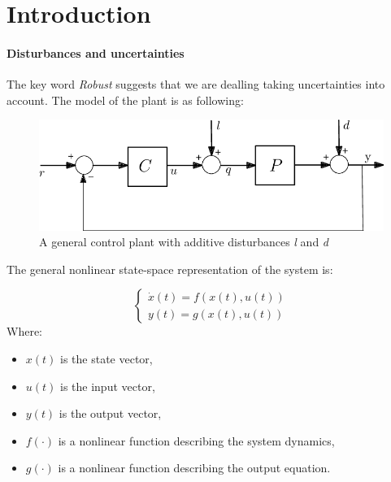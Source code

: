 
\chapter{Introduction}    %
\subsubsection{Disturbances and uncertainties}

    The key word \textit{Robust} suggests that we are dealling taking uncertainties into account. The model of the plant is as following:

\begin{figure}[htbp]
    \centering
    \includegraphics[width=\textwidth]{images/1.png} %
    \caption{A general control plant with additive disturbances \textit{l} and \textit{d}}
    \label{fig:graph_label}
\end{figure}


The general nonlinear state-space representation of the system is:

\begin{equation}
    \begin{cases}
    \dot{x}(t) = f(x(t), u(t)) \\
    y(t) = g(x(t), u(t))
    \end{cases}
\end{equation}
Where:
\begin{itemize}
    \item $x(t)$ is the state vector,
    \item $u(t)$ is the input vector,
    \item $y(t)$ is the output vector,
    \item $f(\cdot)$ is a nonlinear function describing the system dynamics,
    \item $g(\cdot)$ is a nonlinear function describing the output equation.\\
\end{itemize}

